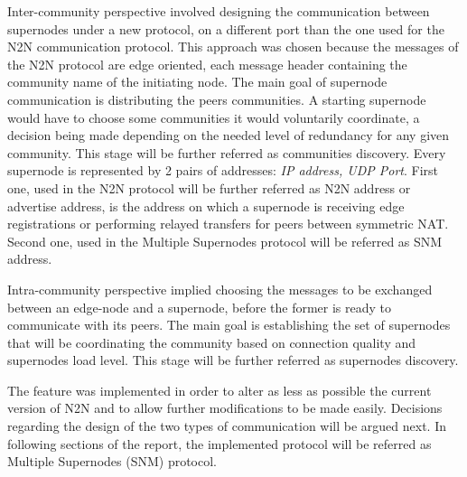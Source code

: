 Inter-community perspective involved designing the communication between supernodes under a new protocol, on a different port than the one used for the N2N communication protocol. This approach was chosen because the messages of the N2N protocol are edge oriented, each message header containing the community name of the initiating node. The main goal of supernode communication is distributing the peers communities. A starting supernode would have to choose some communities it would voluntarily coordinate, a decision being made depending on the needed level of redundancy for any given community. This stage will be further referred as communities discovery. Every supernode is represented by 2 pairs of addresses: \emph{IP address, UDP Port}. First one, used in the N2N protocol will be further referred as N2N address or advertise address, is the address on which a supernode is receiving edge registrations or performing relayed transfers for peers between symmetric NAT. Second one, used in the Multiple Supernodes protocol will be referred as SNM address.

Intra-community perspective implied choosing the messages to be exchanged between an edge-node and a supernode, before the former is ready to communicate with its peers. The main goal is establishing the set of supernodes that will be coordinating the community based on connection quality and supernodes load level. This stage will be further referred as supernodes discovery.

The feature was implemented \cite{git_repo} in order to alter as less as possible the current version of N2N and to allow further modifications to be made easily. Decisions regarding the design of the two types of communication will be argued next. In following sections of the report, the implemented protocol will be referred as Multiple Supernodes (SNM) protocol. 
